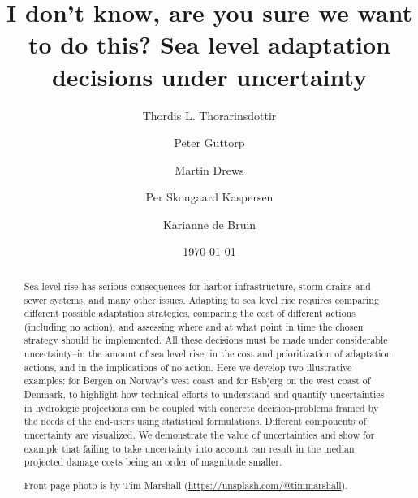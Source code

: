 \documentclass[note,screen,british,11pt]{nrdoc}
\begin{document}
\title{\huge I don't know, are you sure we want to do this? Sea level adaptation decisions under uncertainty}



\author{Thordis L. Thorarinsdottir  \and Peter Guttorp  \and Martin Drews  \and Per Skougaard Kaspersen  \and Karianne de Bruin }


\date{\today}

\maketitle

\begin{abstract}
  Sea level rise has serious consequences for harbor infrastructure, storm drains and sewer systems, and many other issues. Adapting to sea level rise requires comparing different possible adaptation strategies, comparing the cost of different actions (including no action), and assessing where and at what point in time the chosen strategy should be implemented. All these decisions must be made under considerable uncertainty--in the amount of sea level rise, in the cost and prioritization of adaptation actions, and in the implications of no action. Here we develop two illustrative examples: for Bergen on Norway's west coast and for Esbjerg on the west coast of Denmark, to highlight how technical efforts to understand and quantify uncertainties in hydrologic projections can be coupled with concrete decision-problems framed by the needs of the end-users using statistical formulations. Different components of uncertainty are visualized. We demonstrate the value of uncertainties and show for example that failing to take uncertainty into account can  result in the median projected damage costs being an order of magnitude smaller.

  Front page photo is by Tim Marshall (\url{https://unsplash.com/@timmarshall}). 
\end{abstract}
\end{document}
